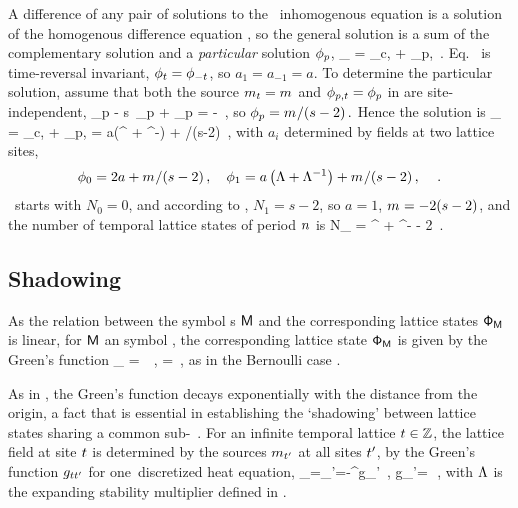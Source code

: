 A difference of any pair of solutions to the \templatt\
inhomogenous equation 
is a solution of the homogenous difference equation
, so the general solution is a sum of the
{complementary} solution \refeq{PC(2.3.4)} and a \emph{particular}
solution $\phi_{p}$,
\beq
\ssp_{\zeit} = \ssp_{c,\zeit} + \ssp_{p,\zeit}
\,.
Eq.~ is time-reversal invariant,
$\ssp_{\zeit} = \ssp_{-\zeit}$, so $a_1=a_{-1}=a$.
To determine the particular solution, assume that both the source
 $\Ssym{\zeit}=\Ssym{}$
and $\ssp_{p,\zeit}=\ssp_{p}$
 in  are site-independent,
\beq
\ssp_{p}  -  s \,\ssp_{p} + \ssp_{p}
    = -\Ssym{}
\,,
so
\(
  \ssp_{p} = \Ssym{}/(s-2)
\,.
\)
Hence the solution is
\beq
\ssp_{\zeit} = \ssp_{c,\zeit} + \ssp_{p,\zeit}
= a\left(\ExpaEig^{\zeit} + \ExpaEig^{-\zeit}\right) + {\Ssym{}}/(s-2)
\,,
with $a_i$ determined by fields at two lattice sites,
\[
\ssp_{0}= 2a + {\Ssym{}}/(s-2)
\,,\quad
\ssp_{1}= a\left(\ExpaEig + \ExpaEig^{-1}\right) + {\Ssym{}}/(s-2)
\,,\quad
\,.
\]
\tempLatt\ starts with $N_{0}=0$, and according to ,
$N_{1}=s-2$, so $a=1$, ${m_{}}=-2(s-2)$, and the number
of temporal lattice states of period ${n_{}}$ is
\beq
N_{\cl{}} =
    \ExpaEig^{\cl{}} + \ExpaEig^{-\cl{}} - 2
\,.

\subsection{Shadowing}
\label{s:tempCatShadow}

As the
relation between the symbol {\brick}s $\mathsf{M}$  and the corresponding
lattice states $\mathsf{\Phi}_{\mathsf{M}}$ is linear, for $\mathsf{M}$ an {\admissible} symbol
\brick, the corresponding lattice state $\mathsf{\Phi}_{\mathsf{M}}$ is given by
the Green's function
\beq
\Xx_\Mm
= \gd\,\Mm
\,,\qquad
\gd = 
\,,
as in the Bernoulli case .

As in , the Green's function 
decays exponentially  with the distance from the origin, a fact that is
essential in establishing the `shadowing' between lattice states sharing
a common sub-\brick\ \Mm. For an infinite temporal lattice
$t\in\mathbb{Z}$, the lattice field at site $t$ is determined by
the sources ${m_{t'}}$ at all sites ${t'}$, by the  Green's function
$g_{tt'}$ for one\dmn\ discretized heat
equation,
\beq
  \ssp_{\zeit}=\sum_{\zeit'=-\infty}^\infty g_{\zeit\zeit'} 
\,, \qquad
g_{\zeit\zeit'}=\,
\,,
with $\Lambda$ is the expanding stability
multiplier defined in .

